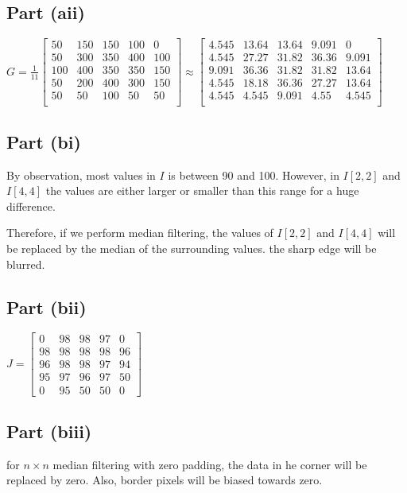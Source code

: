 \documentclass{article}
\begin{document}
    \subsection{Part (aii)}
    $G = \frac{1}{11}\begin{bmatrix}
        50 & 150 & 150 & 100 & 0 \\
        50 & 300 & 350 & 400 & 100 \\
        100 & 400 & 350 & 350 & 150 \\
        50 & 200 & 400 & 300 & 150 \\
        50 & 50 & 100 & 50 & 50 \\
    \end{bmatrix} \approx \begin{bmatrix}
        4.545 & 13.64 & 13.64 & 9.091 & 0 \\
        4.545 & 27.27 & 31.82 & 36.36 & 9.091 \\
        9.091 & 36.36 & 31.82 & 31.82 & 13.64 \\
        4.545 & 18.18 & 36.36 & 27.27 & 13.64 \\
        4.545 & 4.545 & 9.091 & 4.55 & 4.545 \\
    \end{bmatrix}$

    \subsection{Part (bi)}
    By observation, most values in $I$ is between 90 and 100. However, in $I[2,2]$ and $I[4,4]$ the values are either larger or smaller than this range for a huge difference.
    
    \noindent Therefore, if we perform median filtering, the values of $I[2,2]$ and $I[4,4]$ will be replaced by the median of the surrounding values.
    the sharp edge will be blurred.
    
    \subsection{Part (bii)}
    $J = \begin{bmatrix}
        0 & 98 & 98 & 97 & 0 \\
        98 & 98 & 98 & 98 & 96 \\
        96 & 98 & 98 & 97 & 94 \\
        95 & 97 & 96 & 97 & 50 \\
        0 & 95 & 50 & 50 & 0
    \end{bmatrix}$

    \subsection{Part (biii)}
    for $n \times n$ median filtering with zero padding, the data in he corner will be replaced by zero.
    \newline Also, border pixels will be biased towards zero.
\end{document}
